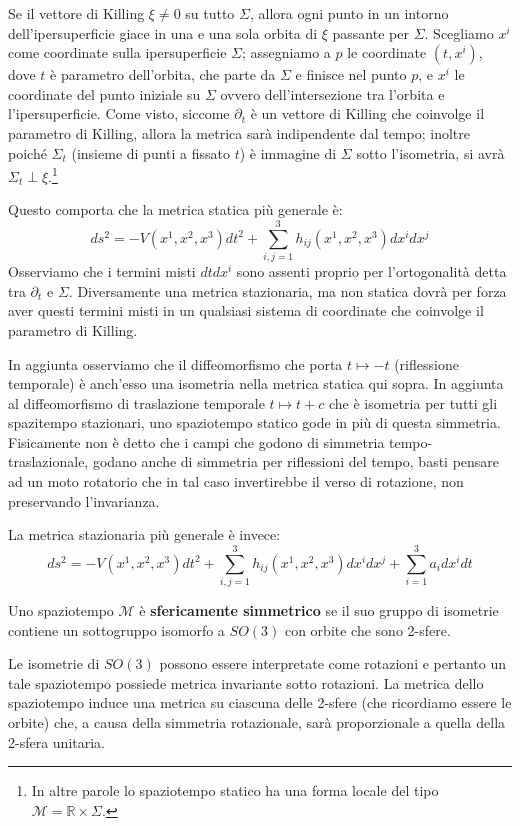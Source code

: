Se il vettore di Killing $\xi\neq0$ su tutto $\Sigma$, allora ogni punto in un intorno dell'ipersuperficie giace in una e una sola orbita di $\xi$ passante per $\Sigma$.  Scegliamo $x^i$ come coordinate sulla ipersuperficie $\Sigma$; assegniamo a $p$ le coordinate $(t,x^i)$, dove $t$ è parametro dell'orbita, che parte da $\Sigma$ e finisce nel punto $p$, e $x^i$ le coordinate del punto iniziale su $\Sigma$ ovvero dell'intersezione tra l'orbita e l'ipersuperficie. Come visto, siccome $\partial_t$ è un vettore di Killing che coinvolge il parametro di Killing, allora la metrica sarà indipendente dal tempo; inoltre poiché $\Sigma_t$ (insieme di punti a fissato $t$) è immagine di $\Sigma$ sotto l'isometria, si avrà $\Sigma_t \perp \xi$.\footnote{In altre parole lo spaziotempo statico ha una forma locale del tipo $\mathcal{M}= \mathbb{R}\times \Sigma.$}

Questo comporta che la metrica statica più generale è:
\begin{equation*}
    ds^2 =- V(x^1,x^2,x^3)dt^2 + \sum_{i,j=1}^3 h_{ij}(x^1,x^2,x^3)dx^i dx^j
\end{equation*}
Osserviamo che i termini misti $dtdx^i$ sono assenti proprio per l'ortogonalità detta tra $\partial_t$ e $\Sigma$. Diversamente una metrica stazionaria, ma non statica dovrà per forza aver questi termini misti in un qualsiasi sistema di coordinate che coinvolge il parametro di Killing.

In aggiunta osserviamo che il diffeomorfismo che porta $t \mapsto -t$ (riflessione temporale) è anch'esso una isometria nella metrica statica qui sopra. In aggiunta al diffeomorfismo di traslazione temporale $t \mapsto t + c$ che è isometria per tutti gli spazitempo stazionari, uno spaziotempo statico gode in più di questa simmetria. Fisicamente non è detto che i campi che godono di simmetria tempo-traslazionale, godano anche di simmetria per riflessioni del tempo, basti pensare ad un moto rotatorio che in tal caso invertirebbe il verso di rotazione, non preservando l'invarianza.

La metrica stazionaria più generale è invece:
\begin{equation*}
    ds^2 = -V(x^1,x^2,x^3)dt^2 + \sum_{i,j=1}^3 h_{ij}(x^1,x^2,x^3)dx^i dx^j + \sum_{i=1}^3 a_{i}dx^idt
\end{equation*}
\begin{definizione}
Uno spaziotempo $\mathcal{M}$ è \textbf{sfericamente simmetrico} se il suo gruppo di isometrie contiene un sottogruppo isomorfo a $SO(3)$ con orbite che sono 2-sfere.
\end{definizione}
Le isometrie di $SO(3)$ possono essere interpretate come rotazioni e pertanto un tale spaziotempo possiede metrica invariante sotto rotazioni. La metrica dello spaziotempo induce una metrica su ciascuna delle 2-sfere (che ricordiamo essere le orbite) che, a causa della simmetria rotazionale, sarà proporzionale a quella della 2-sfera unitaria.

